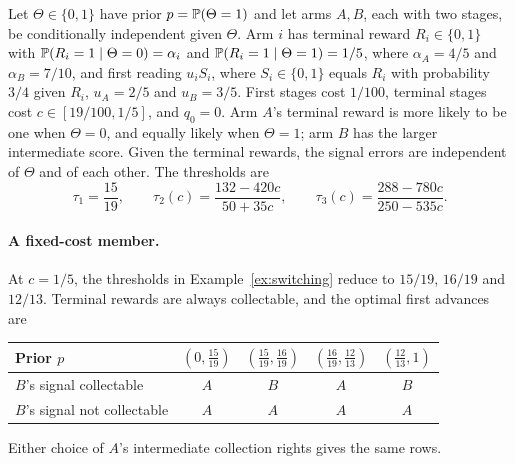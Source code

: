 \begin{example}\label{ex:switching}
Let $\Theta\in\{0,1\}$ have prior $p=\mathbb{P}(\Theta=1)$ and let arms $A,B$, each with two
stages, be conditionally independent given $\Theta$. Arm $i$ has terminal reward
$R_i\in\{0,1\}$ with $\mathbb{P}(R_i=1\mid\Theta=0)=\alpha_i$ and $\mathbb{P}(R_i=1\mid\Theta=1)=1/5$,
where $\alpha_A=4/5$ and $\alpha_B=7/10$, and first reading $u_iS_i$, where $S_i\in\{0,1\}$
equals $R_i$ with probability $3/4$ given $R_i$, $u_A=2/5$ and $u_B=3/5$. First stages cost
$1/100$, terminal stages cost $c\in[19/100,1/5]$, and $q_0=0$. Arm $A$'s terminal reward is
more likely to be one when $\Theta=0$, and equally likely when $\Theta=1$;
arm $B$ has the larger intermediate score. Given the terminal rewards,
the signal errors are independent of $\Theta$ and of each other.
The thresholds are
\[
 \tau_1=\frac{15}{19},\qquad
 \tau_2(c)=\frac{132-420c}{50+35c},\qquad
 \tau_3(c)=\frac{288-780c}{250-535c}.
\]
\end{example}

\paragraph{A fixed-cost member.}
At $c=1/5$, the thresholds in Example~\ref{ex:switching} reduce to
$15/19$, $16/19$ and $12/13$. Terminal rewards are always collectable, and the
optimal first advances are
\begin{center}
\renewcommand{\arraystretch}{1.3}
\begin{tabular}{lcccc}
\toprule
Prior $p$ & $(0,\frac{15}{19})$ & $(\frac{15}{19},\frac{16}{19})$
 & $(\frac{16}{19},\frac{12}{13})$ & $(\frac{12}{13},1)$ \\
\midrule
$B$'s signal collectable & $A$ & $B$ & $A$ & $B$ \\
$B$'s signal not collectable & $A$ & $A$ & $A$ & $A$ \\
\bottomrule
\end{tabular}
\end{center}
Either choice of $A$'s intermediate collection rights gives the same rows.

